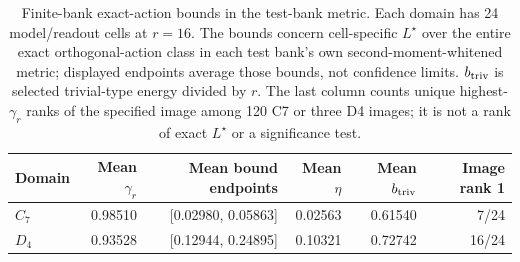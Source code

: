 \begin{table}[t]
\centering\small
\begin{tabular}{@{}lrrrrr@{}}
\toprule
Domain & Mean $\gamma_r$ & Mean bound endpoints & Mean $\eta$ & Mean $b_{\rm triv}$ & Image rank 1 \\
\midrule
$C_7$ & 0.98510 & [0.02980, 0.05863] & 0.02563 & 0.61540 & 7/24 \\
$D_4$ & 0.93528 & [0.12944, 0.24895] & 0.10321 & 0.72742 & 16/24 \\
\bottomrule
\end{tabular}
\caption{Finite-bank exact-action bounds in the test-bank metric. Each domain has 24 model/readout cells at $r=16$. The bounds concern cell-specific $L^\star$ over the entire exact orthogonal-action class in each test bank's own second-moment-whitened metric; displayed endpoints average those bounds, not confidence limits. $b_{\rm triv}$ is selected trivial-type energy divided by $r$. The last column counts unique highest-$\gamma_r$ ranks of the specified image among 120 C7 or three D4 images; it is not a rank of exact $L^\star$ or a significance test.}
\label{tab:followup-spectral}
\end{table}
